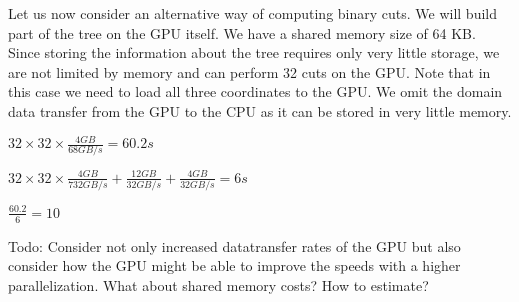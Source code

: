 \documentclass[]{article}
\begin{document}
Let us now consider an alternative way of computing binary cuts. We will build part of the tree on the GPU itself. We have a shared memory size of 64 KB. Since storing the information about the tree requires only very little storage, we are not limited by memory and can perform 32 cuts on the GPU. Note that in this case we need to load all three coordinates to the GPU. We omit the domain data transfer from the GPU to the CPU as it can be stored in very little memory. 

\begin{center}
	$32 \times 32 \times \frac{ 4 GB}{68 GB/s} = 60.2 s$ 
\end{center}

\begin{center}
	$32 \times 32 \times \frac{4 GB}{732 GB/s} + \frac{12 GB}{32 GB/s} + \frac{4 GB}{32 GB/s} = 6 s$ 
\end{center}

\begin{center}
	$\frac{60.2}{6} = 10$ 
\end{center}
 
Todo: Consider not only increased datatransfer rates of the GPU but also consider how the GPU might be able to improve the speeds with a higher parallelization.
What about shared memory costs? How to estimate?



\end{document}
